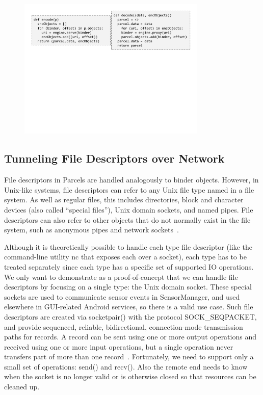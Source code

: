\documentclass[prodmode]{acmlarge}
\begin{document}
\begin{figure}[h]
\centering
\includegraphics[width=0.8\textwidth]{drawings/encodeObjects.pdf}
\end{figure}

\subsection{Tunneling File Descriptors over Network}
File descriptors in Parcels are handled analogously to binder objects. However, in Unix-like systems, file descriptors can refer to any Unix file type named in a file system. As well as regular files, this includes directories, block and character devices (also called ``special files''), Unix domain sockets, and named pipes. File descriptors can also refer to other objects that do not normally exist in the file system, such as anonymous pipes and network sockets~\cite{UnixDomainSocket}.

Although it is theoretically possible to handle each type file descriptor (like the command-line utility nc that exposes each over a socket), each type has to be treated separately since each type has a specific set of supported IO operations. We only want to demonstrate as a proof-of-concept that we can handle file descriptors by focusing on a single type: the Unix domain socket. These special sockets are used to communicate sensor events in SensorManager, and used elsewhere in GUI-related Android services, so there is a valid use case. Such file descriptors are created via socketpair() with the protocol SOCK\_SEQPACKET, and provide sequenced, reliable, bidirectional, connection-mode transmission paths for records. A record can be sent using one or more output operations and received using one or more input operations, but a single operation never transfers part of more than one record~\cite{SocketManPage}. Fortunately, we need to support only a small set of operations: send() and recv(). Also the remote end needs to know when the socket is no longer valid or is otherwise closed so that resources can be cleaned up.
\end{document}
